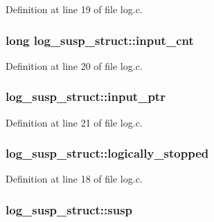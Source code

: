 Definition at line 19 of file log.\+c.

\subsubsection[{\texorpdfstring{input\+\_\+cnt}{input_cnt}}]{\setlength{\rightskip}{0pt plus 5cm}long log\+\_\+susp\+\_\+struct\+::input\+\_\+cnt}\hypertarget{structlog__susp__struct_ac909568815246a93700b1acc4fa7aa2b}{}\label{structlog__susp__struct_ac909568815246a93700b1acc4fa7aa2b}


Definition at line 20 of file log.\+c.

\subsubsection[{\texorpdfstring{input\+\_\+ptr}{input_ptr}}]{ log\+\_\+susp\+\_\+struct\+::input\+\_\+ptr}\hypertarget{structlog__susp__struct_ac3d55701e46fe120344e5820a6aa6a7a}{}\label{structlog__susp__struct_ac3d55701e46fe120344e5820a6aa6a7a}


Definition at line 21 of file log.\+c.

\subsubsection[{\texorpdfstring{logically\+\_\+stopped}{logically_stopped}}]{ log\+\_\+susp\+\_\+struct\+::logically\+\_\+stopped}\hypertarget{structlog__susp__struct_abfd35b98368a909a32cde29522fab78a}{}\label{structlog__susp__struct_abfd35b98368a909a32cde29522fab78a}


Definition at line 18 of file log.\+c.

\subsubsection[{\texorpdfstring{susp}{susp}}]{ log\+\_\+susp\+\_\+struct\+::susp}\hypertarget{structlog__susp__struct_a26ee486b6bce94dacf75c7d26ffa3340}{}\label{structlog__susp__struct_a26ee486b6bce94dacf75c7d26ffa3340}


